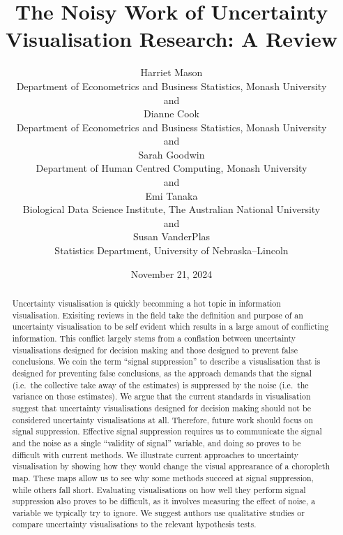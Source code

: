\documentclass[
  12pt]{article}
\begin{document}
\def\spacingset#1{\renewcommand{\baselinestretch}%
{#1}\small\normalsize} \spacingset{1}



\date{November 21, 2024}
\title{\bf The Noisy Work of Uncertainty Visualisation Research: A
Review}
\author{
Harriet Mason\\
Department of Econometrics and Business Statistics, Monash University\\
and\\Dianne Cook\\
Department of Econometrics and Business Statistics, Monash University\\
and\\Sarah Goodwin\\
Department of Human Centred Computing, Monash University\\
and\\Emi Tanaka\\
Biological Data Science Institute, The Australian National University\\
and\\Susan VanderPlas\\
Statistics Department, University of Nebraska--Lincoln\\
}
\maketitle

\bigskip
\bigskip
\begin{abstract}
Uncertainty visualisation is quickly becomming a hot topic in
information visualisation. Exisiting reviews in the field take the
definition and purpose of an uncertainty visualisation to be self
evident which results in a large amout of conflicting information. This
conflict largely stems from a conflation between uncertainty
visualisations designed for decision making and those designed to
prevent false conclusions. We coin the term ``signal suppression'' to
describe a visualisation that is designed for preventing false
conclusions, as the approach demands that the signal (i.e.~the
collective take away of the estimates) is suppressed by the noise
(i.e.~the variance on those estimates). We argue that the current
standards in visualisation suggest that uncertainty visualisations
designed for decision making should not be considered uncertainty
visualisations at all. Therefore, future work should focus on signal
suppression. Effective signal suppression requires us to communicate the
signal and the noise as a single ``validity of signal'' variable, and
doing so proves to be difficult with current methods. We illustrate
current approaches to uncertainty visualisation by showing how they
would change the visual apprearance of a choropleth map. These maps
allow us to see why some methods succeed at signal suppression, while
others fall short. Evaluating visualisations on how well they perform
signal suppression also proves to be difficult, as it involves measuring
the effect of noise, a variable we typically try to ignore. We suggest
authors use qualitative studies or compare uncertainty visualisations to
the relevant hypothesis tests.
\end{abstract}
\end{document}
